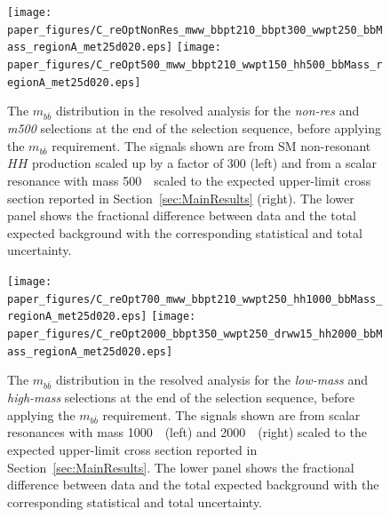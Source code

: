 \begin{figure}
\begin{flushleft}
\texttt{[image: paper\_figures/C\_reOptNonRes\_mww\_bbpt210\_bbpt300\_wwpt250\_bbMass\_regionA\_met25d020.eps]}
\texttt{[image: paper\_figures/C\_reOpt500\_mww\_bbpt210\_wwpt150\_hh500\_bbMass\_regionA\_met25d020.eps]}
\end{flushleft}
\caption{The $m_{b \bar{b}}$ distribution in the resolved analysis for the \emph{non-res} and \emph{m500} selections at the end of the
 selection sequence, before applying the $m_{b \bar{b}}$ requirement. The signals shown
 are from SM non-resonant $HH$ production scaled up by a factor of 300 (left) and from a scalar resonance with mass 500~\GeV\ scaled to the expected upper-limit
 cross section reported in Section~\ref{sec:MainResults} (right).  The lower panel shows the fractional difference
  between data and the total expected background
 with the corresponding statistical and total uncertainty.
} \label{fig:mbb_1}
\end{figure}
 
\begin{figure}
\begin{flushleft}
\texttt{[image: paper\_figures/C\_reOpt700\_mww\_bbpt210\_wwpt250\_hh1000\_bbMass\_regionA\_met25d020.eps]}
\texttt{[image: paper\_figures/C\_reOpt2000\_bbpt350\_wwpt250\_drww15\_hh2000\_bbMass\_regionA\_met25d020.eps]}
\end{flushleft}
\caption{The $m_{b \bar{b}}$ distribution in the resolved analysis for the
 \emph{low-mass} and \emph{high-mass} selections at the end of the
 selection sequence, before applying the $m_{b \bar{b}}$ requirement. The signals shown
 are from scalar resonances with mass 1000~\GeV\ (left) and 2000~\GeV\ (right)
 scaled to the expected upper-limit cross section reported in
 Section~\ref{sec:MainResults}.  The lower panel shows the fractional difference
  between data and the total expected background
 with the corresponding statistical and total uncertainty.} \label{fig:mbb_2}
\end{figure}
 
 
